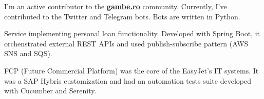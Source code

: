 \documentclass[10pt,a4paper,ragged2e]{altacv}
\begin{document}
\divider



I'm an active contributor to the \textbf{\href{http://gambe.ro}{gambe.ro}} community. Currently, I've contributed to the Twitter and Telegram bots. Bots are written in Python.

\divider

Service implementing personal loan functionality. Developed with Spring Boot, it orchenstrated external REST APIs and used publish-subscribe pattern (AWS SNS and SQS). 

\divider

FCP (Future Commercial Platform) was the core of the EasyJet’s IT systems. It was a SAP Hybris customization and had an automation tests suite developed with Cucumber and Serenity.

\medskip

\clearpage

\end{document}

